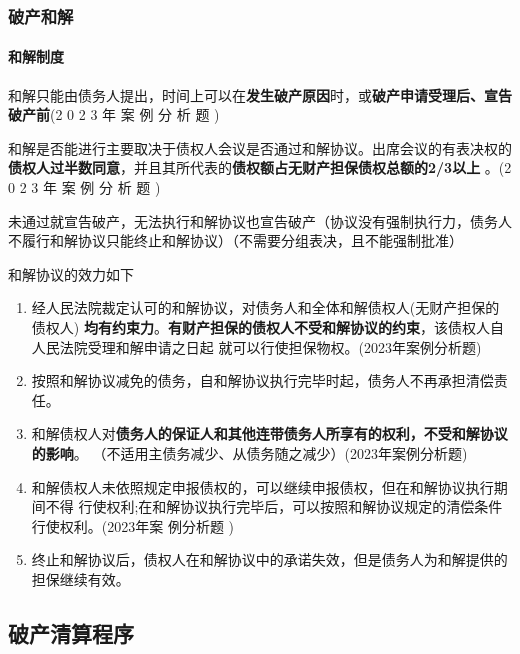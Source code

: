 \documentclass[UTF8,12pt]{ctexart}
\numberwithin{equation}{section} %
\numberwithin{figure}{section}
\numberwithin{table}{section}
\begin{document}
	
	\subsubsection{破产和解}
	\paragraph{和解制度}
	和解只能由债务人提出，时间上可以在\textbf{发生破产原因}时，或\textbf{破产申请受理后、宣告破产前}(2 0 2 3 年 案 例 分 析 题 )
	
	和解是否能进行主要取决于债权人会议是否通过和解协议。出席会议的有表决权的\textbf{债权人过半数同意}，并且其所代表的\textbf{债权额占无财产担保债权总额的2/3以上} 。(2 0 2 3 年 案 例 分 析 题 )
	
	未通过就宣告破产，无法执行和解协议也宣告破产（协议没有强制执行力，债务人不履行和解协议只能终止和解协议）（不需要分组表决，且不能强制批准）

	和解协议的效力如下
	\begin{enumerate}
		\item 经人民法院裁定认可的和解协议，对债务人和全体和解债权人(无财产担保的债权人) \textbf{均有约束力}。\textbf{有财产担保的债权人不受和解协议的约束}，该债权人自人民法院受理和解申请之日起 就可以行使担保物权。(2023年案例分析题) 
		
		\item 按照和解协议减免的债务，自和解协议执行完毕时起，债务人不再承担清偿责任。
		
		\item 和解债权人对\textbf{债务人的保证人和其他连带债务人所享有的权利，不受和解协议的影响}。 （不适用主债务减少、从债务随之减少）(2023年案例分析题)
		
		\item 和解债权人未依照规定申报债权的，可以继续申报债权，但在和解协议执行期间不得 行使权利;在和解协议执行完毕后，可以按照和解协议规定的清偿条件行使权利。(2023年案 例分析题 )
		
		\item 终止和解协议后，债权人在和解协议中的承诺失效，但是债务人为和解提供的担保继续有效。
	\end{enumerate}
	
	
	\subsection{破产清算程序}
\end{document}
